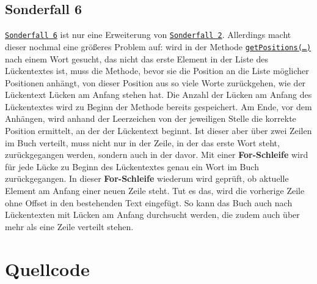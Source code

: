 \documentclass[a4paper, 10pt, ngerman]{scrartcl}
\begin{document}
\subsection{Sonderfall 6}\label{sec:sechsterSonderfall}
\hyperref[sonderfallSechs]{\texttt{Sonderfall 6}} ist nur eine Erweiterung von \hyperref[sonderfallZwei]{\texttt{Sonderfall 2}}.
Allerdings macht dieser nochmal eine größeres Problem auf:
wird in der Methode \hyperref[sec:getPositions()]{\texttt{getPositions(\ldots)}} nach einem Wort gesucht,
das nicht das erste Element in der Liste des Lückentextes ist,
muss die Methode,
bevor sie die Position an die Liste möglicher Positionen anhängt,
von dieser Position aus so viele Worte zurückgehen,
wie der Lückentext Lücken am Anfang stehen hat.
Die Anzahl der Lücken am Anfang des Lückentextes wird zu Beginn der Methode bereits gespeichert.
Am Ende,
vor dem Anhängen,
wird anhand der Leerzeichen von der jeweiligen Stelle die korrekte Position ermittelt,
an der der Lückentext beginnt.
Ist dieser aber über zwei Zeilen im Buch verteilt,
muss nicht nur in der Zeile,
in der das erste Wort steht,
zurückgegangen werden,
sondern auch in der davor.
Mit einer \textbf{For-Schleife} wird für jede Lücke zu Beginn des Lückentextes genau ein Wort im Buch zurückgegangen.
In dieser \textbf{For-Schleife} wiederum wird geprüft,
ob aktuelle Element am Anfang einer neuen Zeile steht.
Tut es das,
wird die vorherige Zeile ohne Offset in den bestehenden Text eingefügt.
So kann das Buch auch nach Lückentexten mit Lücken am Anfang durchsucht werden,
die zudem auch über mehr als eine Zeile verteilt stehen.

\clearpage


\section{Quellcode}\label{sec:quellcode}
\end{document}
